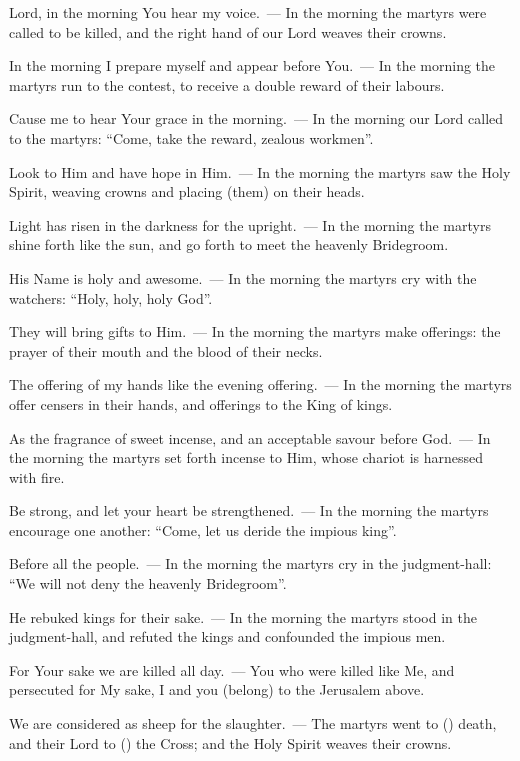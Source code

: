 \documentclass[12pt,twoside,a5paper]{article}
\begin{document}
\begin{halfparskip}
  Lord, in the morning You hear my voice.~--- In the morning the martyrs were called to be killed, and the right hand of our Lord weaves their crowns.

  In the morning I prepare myself and appear before You.~--- In the morning the martyrs run to the contest, to receive a double reward of their labours.

  Cause me to hear Your grace in the morning.~--- In the morning our Lord called to the martyrs: ``Come, take the reward, zealous workmen''.

  Look to Him and have hope in Him.~--- In the morning the martyrs saw the Holy Spirit, weaving crowns and placing (them) on their heads.

  Light has risen in the darkness for the upright.~--- In the morning the martyrs shine forth like the sun, and go forth to meet the heavenly Bridegroom.

  His Name is holy and awesome.~--- In the morning the martyrs cry with the watchers: ``Holy, holy, holy God''.

  They will bring gifts to Him.~--- In the morning the martyrs make offerings: the prayer of their mouth and the blood of their necks.

  The offering of my hands like the evening offering.~--- In the morning the martyrs offer censers in their hands, and offerings to the King of kings.

  As the fragrance of sweet incense, and an acceptable savour before God.~--- In the morning the martyrs set forth incense to Him, whose chariot is harnessed with fire.

  Be strong, and let your heart be strengthened.~--- In the morning the martyrs encourage one another: ``Come, let us deride the impious king''.

  Before all the people.~--- In the morning the martyrs cry in the judgment-hall: ``We will not deny the heavenly Bridegroom''.

  He rebuked kings for their sake.~--- In the morning the martyrs stood in the judgment-hall, and refuted the kings and confounded the impious men.

  For Your sake we are killed all day.~--- You who were killed like Me, and persecuted for My sake, I and you (belong) to the Jerusalem above.

  We are considered as sheep for the slaughter.~--- The martyrs went to () death, and their Lord to () the Cross; and the Holy Spirit weaves their crowns.


\end{halfparskip}
\end{document}
